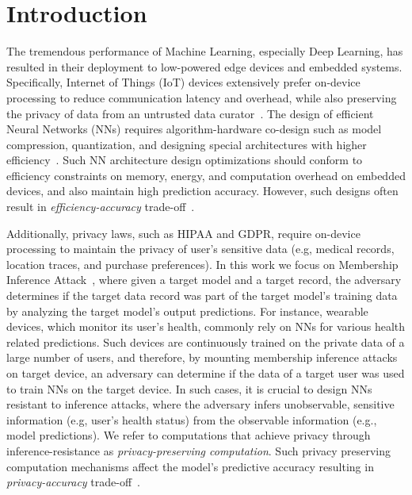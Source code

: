 \section{Introduction}\label{introduction}

The tremendous performance of Machine Learning, especially Deep Learning, has resulted in their deployment to low-powered edge devices and embedded systems.
Specifically, Internet of Things (IoT) devices extensively prefer on-device processing to reduce communication latency and overhead, while also preserving the privacy of data from an untrusted data curator~\cite{8110880}.
The design of efficient Neural Networks (NNs) requires algorithm-hardware co-design such as model compression, quantization, and designing special architectures with higher efficiency~\cite{8114708}.
Such NN architecture design optimizations should conform to efficiency constraints on memory, energy, and computation overhead on embedded devices, and also maintain high prediction accuracy.
However, such designs often result in \textit{efficiency-accuracy} trade-off~\cite{rastegari2016xnornet}.

Additionally, privacy laws, such as HIPAA and GDPR, require on-device processing to maintain the privacy of user's sensitive data (e.g, medical records, location traces, and purchase preferences).
In this work we focus on Membership Inference Attack~\cite{shokri2017membership}, where given a target model and a target record, the adversary determines if the target data record was part of the target model's training data by analyzing the target model's output predictions.
For instance, wearable devices, which monitor its user's health, commonly rely on NNs for various health related predictions.
Such devices are continuously trained on the private data of a large number of users, and therefore, by mounting membership inference attacks on target device, an adversary can determine if the data of a target user was used to train NNs on the target device.
In such cases, it is crucial to design NNs resistant to inference attacks, where the adversary infers unobservable, sensitive information (e.g, user's health status) from the observable information (e.g., model predictions).
We refer to computations that achieve privacy through inference-resistance as {\em privacy-preserving computation}.
Such privacy preserving computation mechanisms affect the model's predictive accuracy resulting in \textit{privacy-accuracy} trade-off~\cite{Abadi:2016:DLD:2976749.2978318,DBLP:conf/ccs/NasrSH18,shejwalkar2019reconciling}.

